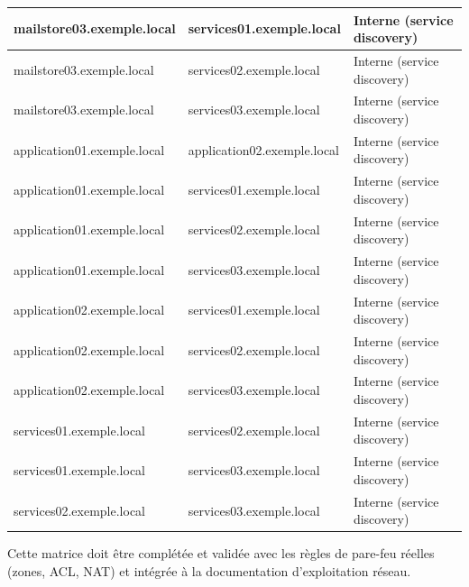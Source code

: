 \documentclass[11pt,a4paper]{report}
\begin{document}
\begin{longtable}{|p{5cm}|p{5cm}|p{5cm}|}
\hline
mailstore03.\allowbreak{}exemple.\allowbreak{}local & services01.\allowbreak{}exemple.\allowbreak{}local & Interne (service discovery) \\
\hline
mailstore03.\allowbreak{}exemple.\allowbreak{}local & services02.\allowbreak{}exemple.\allowbreak{}local & Interne (service discovery) \\
\hline
mailstore03.\allowbreak{}exemple.\allowbreak{}local & services03.\allowbreak{}exemple.\allowbreak{}local & Interne (service discovery) \\
\hline
application01.\allowbreak{}exemple.\allowbreak{}local & application02.\allowbreak{}exemple.\allowbreak{}local & Interne (service discovery) \\
\hline
application01.\allowbreak{}exemple.\allowbreak{}local & services01.\allowbreak{}exemple.\allowbreak{}local & Interne (service discovery) \\
\hline
application01.\allowbreak{}exemple.\allowbreak{}local & services02.\allowbreak{}exemple.\allowbreak{}local & Interne (service discovery) \\
\hline
application01.\allowbreak{}exemple.\allowbreak{}local & services03.\allowbreak{}exemple.\allowbreak{}local & Interne (service discovery) \\
\hline
application02.\allowbreak{}exemple.\allowbreak{}local & services01.\allowbreak{}exemple.\allowbreak{}local & Interne (service discovery) \\
\hline
application02.\allowbreak{}exemple.\allowbreak{}local & services02.\allowbreak{}exemple.\allowbreak{}local & Interne (service discovery) \\
\hline
application02.\allowbreak{}exemple.\allowbreak{}local & services03.\allowbreak{}exemple.\allowbreak{}local & Interne (service discovery) \\
\hline
services01.\allowbreak{}exemple.\allowbreak{}local & services02.\allowbreak{}exemple.\allowbreak{}local & Interne (service discovery) \\
\hline
services01.\allowbreak{}exemple.\allowbreak{}local & services03.\allowbreak{}exemple.\allowbreak{}local & Interne (service discovery) \\
\hline
services02.\allowbreak{}exemple.\allowbreak{}local & services03.\allowbreak{}exemple.\allowbreak{}local & Interne (service discovery) \\
\hline
\end{longtable}
Cette matrice doit être complétée et validée avec les règles de pare-feu réelles (zones, ACL, NAT) et intégrée à la documentation d'exploitation réseau.
\end{document}
